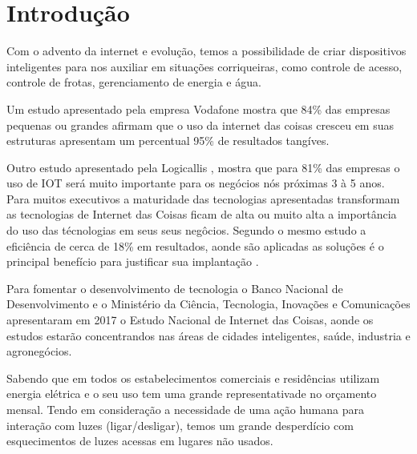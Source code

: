 \documentclass[openright]{normas-utf-tex} %
\begin{document}
\listadefiguras %


\sumario %


\setcounter{page}{12}


\chapter{Introdução}


Com o advento da internet e evolução, temos a possibilidade de criar dispositivos inteligentes \cite{Novatec} para nos auxiliar em situações corriqueiras, como controle de acesso, controle de frotas, gerenciamento de energia e água.

Um estudo apresentado pela empresa Vodafone \cite{Vodafone} mostra que 84\%  das empresas pequenas ou grandes afirmam que o uso da internet das coisas cresceu em suas estruturas apresentam  um  percentual 95\% de resultados tangíves.

Outro estudo apresentado pela Logicallis \cite{Logicallis}, mostra que para 81\% das empresas o uso de IOT será muito importante para os negócios nós próximas 3 à 5 anos. Para muitos executivos a maturidade das tecnologias apresentadas transformam as tecnologias de Internet das Coisas ficam de alta ou muito alta a importância do uso das técnologias em seus seus negôcios. Segundo o mesmo estudo a eficiência de cerca de 18\% em resultados, aonde são aplicadas as soluções  é o principal benefício para justificar sua implantação \cite{IotSnapshot}.
 
Para fomentar o desenvolvimento de tecnologia o Banco Nacional de Desenvolvimento  e o Ministério da Ciência, Tecnologia, Inovações e Comunicações  apresentaram em 2017 o Estudo Nacional de Internet das Coisas, aonde os estudos estarão concentrandos nas áreas de cidades inteligentes, saúde, industria e agronegócios\cite{BNDES}.
 
Sabendo que em todos os estabelecimentos comerciais e residências utilizam energia elétrica e o seu uso tem uma grande representativade no orçamento mensal. Tendo em  consideração a necessidade de uma ação humana para interação com luzes (ligar/desligar), temos um grande desperdício com esquecimentos de luzes acessas em lugares não usados.
\end{document}
